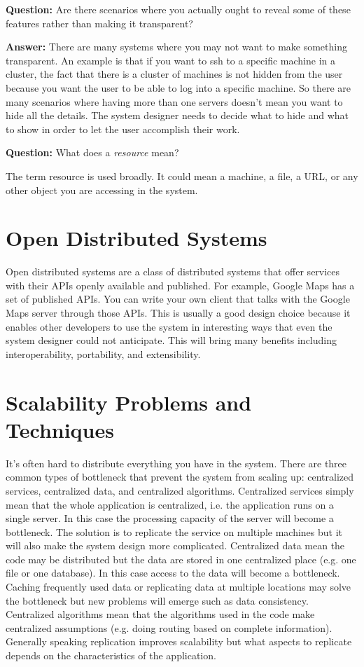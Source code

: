 \documentclass[twoside]{article}
\begin{document}
\textbf{Question:} Are there scenarios where you actually ought to reveal some of these features rather than making it transparent?

\textbf{Answer:} There are many systems where you may not want to make something transparent. An example is that if you want to ssh to a specific machine in a cluster, the fact that there is a cluster of machines is not hidden from the user because you want the user to be able to log into a specific machine. So there are many scenarios where having more than one servers doesn't mean you want to hide all the details. The system designer needs to decide what to hide and what to show in order to let the user accomplish their work.

\textbf{Question:} What does a \textit{resource} mean?

The term resource is used broadly. It could mean a machine, a file, a URL, or any other object you are accessing in the system.

\section{Open Distributed Systems}

Open distributed systems are a class of distributed systems that offer services with their APIs openly available and published. For example, Google Maps has a set of published APIs. You can write your own client that talks with the Google Maps server through those APIs. This is usually a good design choice because it enables other developers to use the system in interesting ways that even the system designer could not anticipate. This will bring many benefits including interoperability, portability, and extensibility.

\label{scalability-problems}
\section{Scalability Problems and Techniques}

It's often hard to distribute everything you have in the system. There are three common types of bottleneck that prevent the system from scaling up: centralized services, centralized data, and centralized algorithms. 
Centralized services simply mean that the whole application is centralized, i.e. the application runs on a single server. In this case the processing capacity of the server will become a bottleneck. The solution is to replicate the service on multiple machines but it will also make the system design more complicated. 
Centralized data mean the code may be distributed but the data are stored in one centralized place (e.g. one file or one database). In this case access to the data will become a bottleneck. Caching frequently used data or replicating data at multiple locations may solve the bottleneck but new problems will emerge such as data consistency.
Centralized algorithms mean that the algorithms used in the code make centralized assumptions (e.g. doing routing based on complete information). 
Generally speaking replication improves scalability but what aspects to replicate depends on the characteristics of the application.
\end{document}

